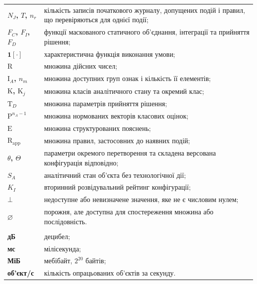 \begin{longtable}{>{\bfseries}p{}p{}}
$N_J$, $T$, $n_r$ & кількість записів початкового журналу, допущених подій і правил, що перевіряються для однієї події;\\
$F_C$, $F_I$, $F_D$ & функції маскованого статичного об’єднання, інтеграції та прийняття рішення;\\
$\mathbf 1[\cdot]$ & характеристична функція виконання умови;\\
$\mathrm R$ & множина дійсних чисел;\\
$\mathrm I_A$, $n_m$ & множина доступних груп ознак і кількість її елементів;\\
$\mathrm K$, $\mathrm K_j$ & множина класів аналітичного стану та окремий клас;\\
$\mathrm T_D$ & множина параметрів прийняття рішення;\\
$\mathrm P^{n_A-1}$ & множина нормованих векторів класових оцінок;\\
$\mathrm E$ & множина структурованих пояснень;\\
$\mathrm R_{\mathrm{app}}$ & множина правил, застосовних до наявних подій;\\
$\theta$, $\Theta$ & параметри окремого перетворення та складена версована конфігурація відповідно;\\
$S_A$ & аналітичний стан об’єкта без технологічної дії;\\
$K_I$ & вторинний розвідувальний рейтинг конфігурації;\\
$\bot$ & недоступне або невизначене значення, яке не є числовим нулем;\\
$\varnothing$ & порожня, але доступна для спостереження множина або послідовність.\\
\addlinespace
\multicolumn{2}{l}{\textbf{Одиниці вимірювання}}\\
дБ & децибел;\\
мс & мілісекунда;\\
МіБ & мебібайт, $2^{20}$ байтів;\\
об’єкт/с & кількість опрацьованих об’єктів за секунду.\\
\end{longtable}
\endgroup
\setcounter{table}{0}

\clearpage

